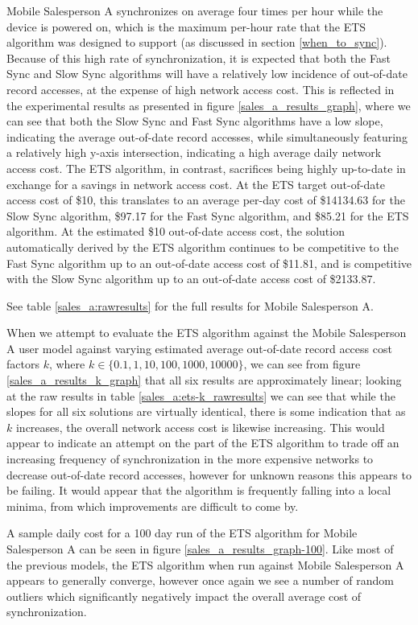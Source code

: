 Mobile Salesperson A synchronizes on average four times per hour while the device is powered on, which is the maximum per-hour rate that the ETS algorithm was designed to support (as discussed in section \ref{when_to_sync}).  Because of this high rate of synchronization, it is expected that both the Fast Sync and Slow Sync algorithms will have a relatively low incidence of out-of-date record accesses, at the expense of high network access cost.  This is reflected in the experimental results as presented in figure \ref{sales_a_results_graph}, where we can see that both the Slow Sync and Fast Sync algorithms have a low slope, indicating the average out-of-date record accesses, while simultaneously featuring a relatively high y-axis intersection, indicating a high average daily network access cost.  The ETS algorithm, in contrast, sacrifices being highly up-to-date in exchange for a savings in network access cost.  At the ETS target out-of-date access cost of \$10, this translates to an average per-day cost of \$14134.63 for the Slow Sync algorithm, \$97.17 for the Fast Sync algorithm, and \$85.21 for the ETS algorithm.  At the estimated \$10 out-of-date access cost, the solution automatically derived by the ETS algorithm continues to be competitive to the Fast Sync algorithm up to an out-of-date access cost of \$11.81, and is competitive with the Slow Sync algorithm up to an out-of-date access cost of \$2133.87.

See table \ref{sales_a:rawresults} for the full results for Mobile Salesperson A.

When we attempt to evaluate the ETS algorithm against the Mobile Salesperson A user model against varying estimated average out-of-date record access cost factors $k$, where $k \in \{0.1, 1, 10, 100, 1000, 10000\}$, we can see from figure \ref{sales_a_results_k_graph} that all six results are approximately linear; looking at the raw results in table \ref{sales_a:ets-k_rawresults} we can see that while the slopes for all six solutions are virtually identical, there is some indication that as $k$ increases, the overall network access cost is likewise increasing.  This would appear to indicate an attempt on the part of the ETS algorithm to trade off an increasing frequency of synchronization in the more expensive networks to decrease out-of-date record accesses, however for unknown reasons this appears to be failing.  It would appear that the algorithm is frequently falling into a local minima, from which improvements are difficult to come by.

A sample daily cost for a 100 day run of the ETS algorithm for Mobile Salesperson A can be seen in figure \ref{sales_a_results_graph-100}.  Like most of the previous models, the ETS algorithm when run against Mobile Salesperson A appears to generally converge, however once again we see a number of random outliers which significantly negatively impact the overall average cost of synchronization.

